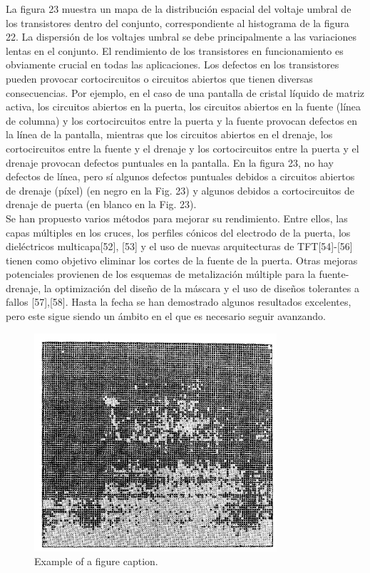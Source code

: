 \documentclass[conference]{IEEEtran}
\begin{document}
    La figura 23 muestra un mapa de la distribución espacial del voltaje umbral de los transistores dentro 
    del conjunto, correspondiente al histograma de la figura 22. La dispersión de los voltajes umbral se 
    debe principalmente a las variaciones lentas en el conjunto. El rendimiento de los transistores en 
    funcionamiento es obviamente crucial en todas las aplicaciones. Los defectos en los transistores pueden 
    provocar cortocircuitos o circuitos abiertos que tienen diversas consecuencias. Por ejemplo, en el caso 
    de una pantalla de cristal líquido de matriz activa, los circuitos abiertos en la puerta, los circuitos 
    abiertos en la fuente (línea de columna) y los cortocircuitos entre la puerta y la fuente provocan 
    defectos en la línea de la pantalla, mientras que los circuitos abiertos en el drenaje, los 
    cortocircuitos entre la fuente y el drenaje y los cortocircuitos entre la puerta y el drenaje provocan 
    defectos puntuales en la pantalla. En la figura 23, no hay defectos de línea, pero sí algunos defectos 
    puntuales debidos a circuitos abiertos de drenaje (píxel) (en negro en la Fig. 23) y algunos debidos a 
    cortocircuitos de drenaje de puerta (en blanco en la Fig. 23).
    \\
    Se han propuesto varios métodos para mejorar su rendimiento. Entre ellos, las capas múltiples en los 
    cruces, los perfiles cónicos del electrodo de la puerta, los dieléctricos multicapa[52], [53] y el uso 
    de nuevas arquitecturas de TFT[54]-[56] tienen como objetivo eliminar los cortes de la fuente de la 
    puerta. Otras mejoras potenciales provienen de los esquemas de metalización múltiple para la 
    fuente-drenaje, la optimización del diseño de la máscara y el uso de diseños tolerantes a fallos [57],[58].
    Hasta la fecha se han demostrado algunos resultados excelentes, pero este sigue siendo un ámbito en el
    que es necesario seguir avanzando.

\begin{figure}[htbp]
    \centerline{\includegraphics[width=9.0cm]{img/imagen-23.png}}
    \caption{Example of a figure caption.}%
    \label{fig23}
\end{figure} 
\end{document}
